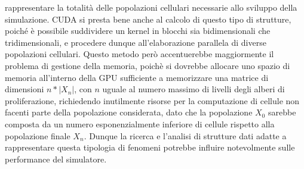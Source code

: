 rappresentare la totalità delle popolazioni cellulari necessarie allo sviluppo 
della simulazione. CUDA si presta bene anche al calcolo di questo tipo di 
strutture, poiché è possibile suddividere un kernel in blocchi sia 
bidimensionali che tridimensionali, e procedere dunque all'elaborazione 
parallela di diverse popolazioni cellulari.
Questo metodo però accentuerebbe maggiormente il problema di gestione della 
memoria, poichè si dovrebbe allocare uno spazio di memoria all'interno della 
GPU sufficiente a memorizzare una matrice di dimensioni $n * |X_{n}|$, con 
$n$ uguale al numero massimo di livelli degli alberi di proliferazione, 
richiedendo inutilmente risorse per la computazione di cellule non 
facenti parte della popolazione considerata, dato che la popolazione $X_{0}$ 
sarebbe composta da un numero esponenzialmente inferiore di cellule rispetto 
alla popolazione finale $X_{n}$. Dunque la ricerca e 
l'analisi di strutture dati adatte a rappresentare questa tipologia di 
fenomeni potrebbe influire notevolmente sulle performance del simulatore.
